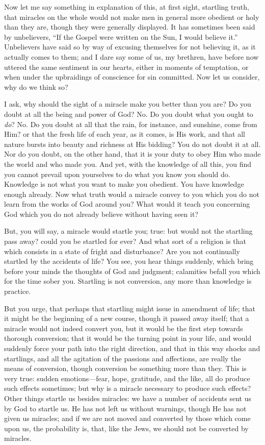 Now let me say something in explanation of this, at first sight,
startling truth, that miracles on the whole would not make men in
general more obedient or holy than they are, though they were
generally displayed. It has sometimes been said by unbelievers,
``If the Gospel were written on the Sun, I would believe it.''
Unbelievers have said so by way of excusing themselves for not
believing it, as it actually comes to them; and I dare say some of us,
my brethren, have before now uttered the same sentiment in our hearts,
either in moments of temptation, or when under the upbraidings of
conscience for sin committed. Now let us consider, why do we think so?

I ask, why should the sight of a miracle make you better than you
are? Do you doubt at all the being and power of God? No. Do you doubt
what you ought to \emph{do}? No. Do you doubt at all that the rain,
for instance, and sunshine, come from Him? or that the fresh life of
each year, as it comes, is His work, and that all nature bursts into
beauty and richness at His bidding? You do not doubt it at all. Nor do
you doubt, on the other hand, that it is your duty to obey Him who
made the world and who made you. And yet, with the knowledge of all
this, you find you cannot prevail upon yourselves to do what you know
you should do. Knowledge is not what you want to make you obedient.
You have knowledge enough already. Now what truth would a miracle
convey to you which you do not learn from the works of God around you?
What would it teach you concerning God which you do not already
believe without having seen it?

But, you will say, a miracle would startle you; true: but would not
the startling pass away? could you be startled for ever? And what sort
of a religion is that which consists in a state of fright and
disturbance? Are you not continually startled by the accidents of
life? You see, you hear things suddenly, which bring before your minds
the thoughts of God and judgment; calamities befall you which for the
time sober you. Startling is not conversion, any more than knowledge
is practice.

But you urge, that perhaps that startling might issue in amendment
of life; that it might be the beginning of a new course, though it
passed away itself; that a miracle would not indeed convert you, but
it would be the first step towards thorough conversion; that it would
be the turning point in your life, and would suddenly force your path
into the right direction, and that in this way shocks and startlings,
and all the agitation of the passions and affections, are really the
means of conversion, though conversion be something more than they.
This is very true: sudden emotions—fear, hope, gratitude, and the
like, all do produce such effects sometimes; but why is a miracle
necessary to produce such effects? Other things startle us besides
miracles: we have a number of accidents sent us by God to startle us.
He has not left us without warnings, though He has not given us
miracles; and if we are not moved and converted by those which come
upon us, the probability is, that, like the Jews, we should not be
converted by miracles.

